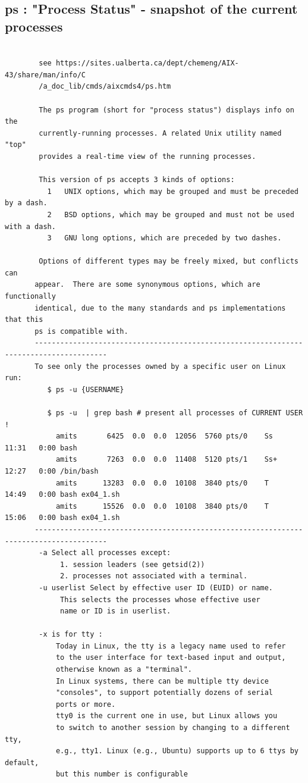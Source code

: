 \documentclass[a4paper,12pt]{article}
\begin{document}
\subsection{ps     : "Process Status" - snapshot of the current processes }
\begin{verbatim}
        
        see https://sites.ualberta.ca/dept/chemeng/AIX-43/share/man/info/C
        /a_doc_lib/cmds/aixcmds4/ps.htm
        
        The ps program (short for "process status") displays info on the 
        currently-running processes. A related Unix utility named "top"
        provides a real-time view of the running processes.   
        
        This version of ps accepts 3 kinds of options:
          1   UNIX options, which may be grouped and must be preceded by a dash.
          2   BSD options, which may be grouped and must not be used with a dash.
          3   GNU long options, which are preceded by two dashes.

        Options of different types may be freely mixed, but conflicts can
       appear.  There are some synonymous options, which are functionally
       identical, due to the many standards and ps implementations that this
       ps is compatible with.
       ---------------------------------------------------------------------------------------
       To see only the processes owned by a specific user on Linux run: 
          $ ps -u {USERNAME}

          $ ps -u  | grep bash # present all processes of CURRENT USER !
            amits       6425  0.0  0.0  12056  5760 pts/0    Ss   11:31   0:00 bash
            amits       7263  0.0  0.0  11408  5120 pts/1    Ss+  12:27   0:00 /bin/bash
            amits      13283  0.0  0.0  10108  3840 pts/0    T    14:49   0:00 bash ex04_1.sh
            amits      15526  0.0  0.0  10108  3840 pts/0    T    15:06   0:00 bash ex04_1.sh
       ---------------------------------------------------------------------------------------
        -a Select all processes except:
             1. session leaders (see getsid(2))
             2. processes not associated with a terminal.        
        -u userlist Select by effective user ID (EUID) or name.
             This selects the processes whose effective user 
             name or ID is in userlist.
             
        -x is for tty : 
            Today in Linux, the tty is a legacy name used to refer
            to the user interface for text-based input and output,
            otherwise known as a "terminal".
            In Linux systems, there can be multiple tty device
            "consoles", to support potentially dozens of serial
            ports or more.
            tty0 is the current one in use, but Linux allows you 
            to switch to another session by changing to a different tty,
            e.g., tty1. Linux (e.g., Ubuntu) supports up to 6 ttys by default,
            but this number is configurable     
           

\end{verbatim}
\end{document}
